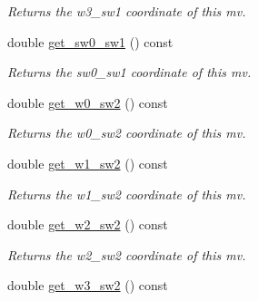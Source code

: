 \begin{DoxyCompactItemize}
\begin{DoxyCompactList}\small\item\em Returns the w3\-\_\-sw1 coordinate of this mv. \end{DoxyCompactList}\item 
\hypertarget{classe3ga_1_1mv_a6165202332fd8f0b98c394c1367f00ec}{double \hyperlink{classe3ga_1_1mv_a6165202332fd8f0b98c394c1367f00ec}{get\-\_\-sw0\-\_\-sw1} () const }\label{classe3ga_1_1mv_a6165202332fd8f0b98c394c1367f00ec}

\begin{DoxyCompactList}\small\item\em Returns the sw0\-\_\-sw1 coordinate of this mv. \end{DoxyCompactList}\item 
\hypertarget{classe3ga_1_1mv_a0ca0b653b16a1389215d8a370356450e}{double \hyperlink{classe3ga_1_1mv_a0ca0b653b16a1389215d8a370356450e}{get\-\_\-w0\-\_\-sw2} () const }\label{classe3ga_1_1mv_a0ca0b653b16a1389215d8a370356450e}

\begin{DoxyCompactList}\small\item\em Returns the w0\-\_\-sw2 coordinate of this mv. \end{DoxyCompactList}\item 
\hypertarget{classe3ga_1_1mv_a5484b8910d97d44bf7dc92ab75286b70}{double \hyperlink{classe3ga_1_1mv_a5484b8910d97d44bf7dc92ab75286b70}{get\-\_\-w1\-\_\-sw2} () const }\label{classe3ga_1_1mv_a5484b8910d97d44bf7dc92ab75286b70}

\begin{DoxyCompactList}\small\item\em Returns the w1\-\_\-sw2 coordinate of this mv. \end{DoxyCompactList}\item 
\hypertarget{classe3ga_1_1mv_a6f19598fdf30a9a50c734236f87461aa}{double \hyperlink{classe3ga_1_1mv_a6f19598fdf30a9a50c734236f87461aa}{get\-\_\-w2\-\_\-sw2} () const }\label{classe3ga_1_1mv_a6f19598fdf30a9a50c734236f87461aa}

\begin{DoxyCompactList}\small\item\em Returns the w2\-\_\-sw2 coordinate of this mv. \end{DoxyCompactList}\item 
\hypertarget{classe3ga_1_1mv_a0c53d78bf5a7c5b476eaeb29ed381ebf}{double \hyperlink{classe3ga_1_1mv_a0c53d78bf5a7c5b476eaeb29ed381ebf}{get\-\_\-w3\-\_\-sw2} () const }\label{classe3ga_1_1mv_a0c53d78bf5a7c5b476eaeb29ed381ebf}


\end{DoxyCompactItemize}
